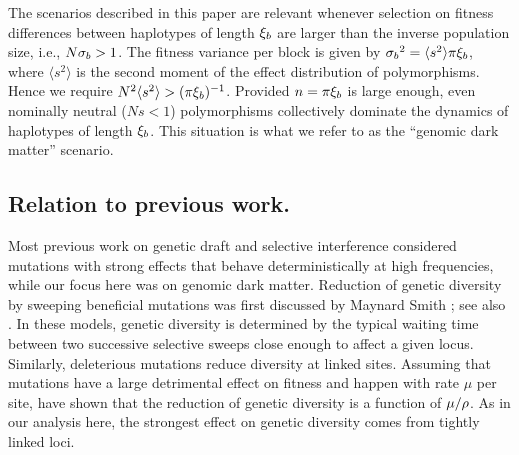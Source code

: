 The scenarios described in this paper are relevant whenever selection on
fitness differences between haplotypes of length ${\xi_b}$ are larger
than the inverse population size, i.e., $N {\sigma_b} >1$.  The fitness
variance per block is given by $ {\sigma_b}^2 = \langle s^2\rangle \pi
{\xi_b}$, where $\langle s^2\rangle$ is the second moment of the effect
distribution of polymorphisms. Hence
we require $N^2\langle s^2\rangle > (\pi {\xi_b})^{-1}$.  Provided
$n=\pi {\xi_b}$ is large
enough, even nominally neutral ($Ns <1$) polymorphisms collectively
dominate the dynamics of haplotypes of length ${\xi_b}$. This situation
is what we refer to as the ``genomic dark matter'' scenario.


\subsection*{Relation to previous work.}
Most previous work on genetic draft and selective interference
considered mutations with strong effects that behave deterministically
at high frequencies, while our focus here was on genomic dark matter.
Reduction of genetic diversity by sweeping beneficial mutations was first
discussed by Maynard Smith \cite{Smith:1974p34217}; see also
\cite{Barton:1998p28270,Gillespie:2000p28513}. In these models, genetic
diversity is determined by the typical waiting time between two
successive selective sweeps close enough to affect a given locus.
Similarly, deleterious mutations reduce diversity at linked sites. 
Assuming that mutations have a large detrimental effect on fitness and
happen with rate $\mu$ per site,
\cite{Hudson:1995p18197,Nordborg:1996p18149} have shown that the
reduction of genetic diversity is a function of $\mu/\rho$. As in our
analysis here, the strongest effect on genetic diversity comes from
tightly linked loci.

